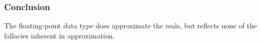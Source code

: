 \begin{frame}

\frametitle{Conclusion}

\begin{center}

The floating-point data type does approximate the reals, but reflects none of
the fallacies inherent in approximation.

\end{center}

\end{frame}
